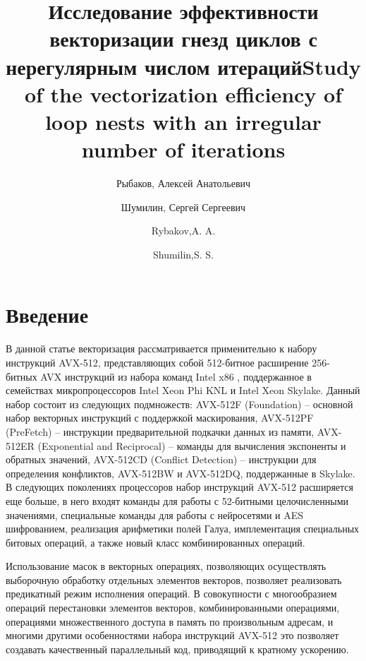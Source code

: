 \documentclass[utf8]{psta}
\title[исследование эффективности векторизации]{Исследование эффективности векторизации гнезд циклов с нерегулярным числом итераций}
\author{Рыбаков, Алексей Анатольевич}
\author{Шумилин, Сергей Сергеевич}
\title[Study of the vectorization efficiency]{Study of the vectorization efficiency of loop nests with an irregular number of iterations}
\author{Rybakov,A. A.}
\author{Shumilin,S. S.}
\begin{document}
           
\maketitle   

\section*{Введение}

В данной статье векторизация рассматривается применительно к набору инструкций AVX-512, представляющих собой 512-битное расширение 256-битных AVX инструкций из набора команд Intel x86 \cite{intel_manual}, поддержанное в семействах микропроцессоров Intel Xeon Phi KNL \cite{Jeffers} и Intel Xeon Skylake. 
Данный набор состоит из следующих подмножеств: AVX-512F (Foundation) -- основной набор векторных инструкций с поддержкой маскирования, AVX-512PF (PreFetch) -- инструкции предварительной подкачки данных из памяти, AVX-512ER (Exponential and Reciprocal) -- команды для вычисления экспоненты и обратных значений, AVX-512CD (Conflict Detection) -- инструкции для определения конфликтов, AVX-512BW и AVX-512DQ, поддержанные в Skylake. 
В следующих поколениях процессоров набор инструкций AVX-512 расширяется еще больше, в него входят команды для работы с 52-битными целочисленными значениями, специальные команды для работы с нейросетями и AES шифрованием, реализация арифметики полей Галуа, имплементация специальных битовых операций, а также новый класс комбинированных операций.

Использование масок в векторных операциях, позволяющих осуществлять выборочную обработку отдельных элементов векторов, позволяет реализовать предикатный режим исполнения операций. 
В совокупности с многообразием операций перестановки элементов векторов, комбинированными операциями, операциями множественного доступа в память по произвольным адресам, и многими другими особенностями набора инструкций AVX-512 это позволяет создавать качественный параллельный код, приводящий к кратному ускорению.
\end{document}
